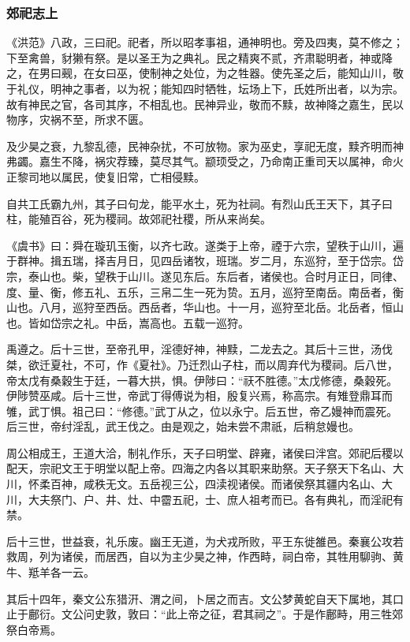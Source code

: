 \documentclass[]{article}
\begin{document}
\hypertarget{header-n1696}{%
\subsubsection{郊祀志上}\label{header-n1696}}

《洪范》八政，三曰祀。祀者，所以昭孝事祖，通神明也。旁及四夷，莫不修之；下至禽兽，豺獭有祭。是以圣王为之典礼。民之精爽不贰，齐肃聪明者，神或降之，在男曰觋，在女曰巫，使制神之处位，为之牲器。使先圣之后，能知山川，敬于礼仪，明神之事者，以为祝；能知四时牺牲，坛场上下，氏姓所出者，以为宗。故有神民之官，各司其序，不相乱也。民神异业，敬而不黩，故神降之嘉生，民以物序，灾祸不至，所求不匮。

及少昊之衰，九黎乱德，民神杂扰，不可放物。家为巫史，享祀无度，黩齐明而神弗蠲。嘉生不降，祸灾荐臻，莫尽其气。颛顼受之，乃命南正重司天以属神，命火正黎司地以属民，使复旧常，亡相侵黩。

自共工氏霸九州，其子曰句龙，能平水土，死为社祠。有烈山氏王天下，其子曰柱，能殖百谷，死为稷祠。故郊祀社稷，所从来尚矣。

《虞书》曰：舜在璇玑玉衡，以齐七政。遂类于上帝，禋于六宗，望秩于山川，遍于群神。揖五瑞，择吉月日，见四岳诸牧，班瑞。岁二月，东巡狩，至于岱宗。岱宗，泰山也。柴，望秩于山川。遂见东后。东后者，诸侯也。合时月正日，同律、度、量、衡，修五礼、五乐，三帛二生一死为贽。五月，巡狩至南岳。南岳者，衡山也。八月，巡狩至西岳。西岳者，华山也。十一月，巡狩至北岳。北岳者，恒山也。皆如岱宗之礼。中岳，嵩高也。五载一巡狩。

禹遵之。后十三世，至帝孔甲，淫德好神，神黩，二龙去之。其后十三世，汤伐桀，欲迁夏社，不可，作《夏社》。乃迁烈山子柱，而以周弃代为稷祠。后八世，帝太戊有桑穀生于廷，一暮大拱，惧。伊陟曰：``祆不胜德。''太戊修德，桑穀死。伊陟赞巫咸。后十三世，帝武丁得傅说为相，殷复兴焉，称高宗。有雉登鼎耳而雊，武丁惧。祖己曰：``修德。''武丁从之，位以永宁。后五世，帝乙嫚神而震死。后三世，帝纣淫乱，武王伐之。由是观之，始未尝不肃祇，后稍怠嫚也。

周公相成王，王道大洽，制礼作乐，天子曰明堂、辟雍，诸侯曰泮宫。郊祀后稷以配天，宗祀文王于明堂以配上帝。四海之内各以其职来助祭。天子祭天下名山、大川，怀柔百神，咸秩无文。五岳视三公，四渎视诸侯。而诸侯祭其疆内名山、大川，大夫祭门、户、井、灶、中霤五祀，士、庶人祖考而已。各有典礼，而淫祀有禁。

后十三世，世益衰，礼乐废。幽王无道，为犬戎所败，平王东徙雒邑。秦襄公攻若救周，列为诸侯，而居西，自以为主少昊之神，作西畤，祠白帝，其牲用駠驹、黄牛、羝羊各一云。

其后十四年，秦文公东猎汧、渭之间，卜居之而吉。文公梦黄蛇自天下属地，其口止于鄜衍。文公问史敦，敦曰：``此上帝之征，君其祠之''。于是作鄜畤，用三牲郊祭白帝焉。
\end{document}

